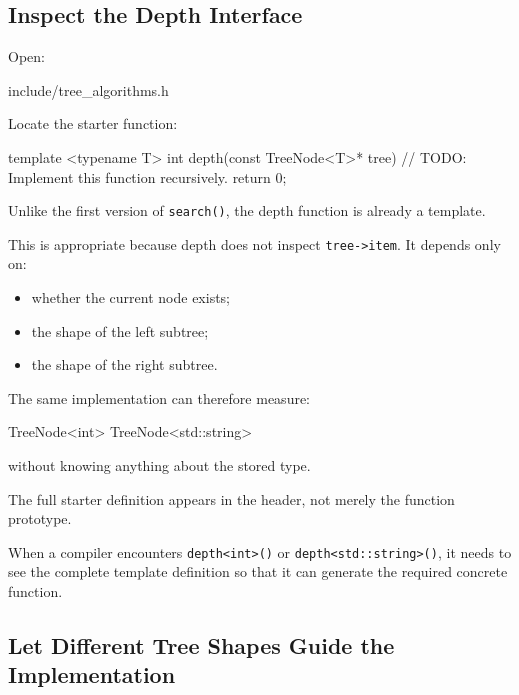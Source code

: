 \documentclass{csc2059practical}
\begin{document}
\subsection{Inspect the Depth Interface}

Open:

\begin{terminal}
include/tree_algorithms.h
\end{terminal}

Locate the starter function:

\begin{cppcode}
template <typename T>
int depth(const TreeNode<T>* tree)
{
    // TODO: Implement this function recursively.
    return 0;
}
\end{cppcode}

Unlike the first version of \texttt{search()}, the depth function is
already a template.

This is appropriate because depth does not inspect
\texttt{tree->item}. It depends only on:

\begin{itemize}
    \item whether the current node exists;
    \item the shape of the left subtree;
    \item the shape of the right subtree.
\end{itemize}

The same implementation can therefore measure:

\begin{cppcode}
TreeNode<int>
TreeNode<std::string>
\end{cppcode}

without knowing anything about the stored type.

\begin{importantnote}
The full starter definition appears in the header, not merely the function
prototype.

When a compiler encounters \texttt{depth<int>()} or
\texttt{depth<std::string>()}, it needs to see the complete template
definition so that it can generate the required concrete function.
\end{importantnote}

\subsection{Let Different Tree Shapes Guide the Implementation}
\end{document}
